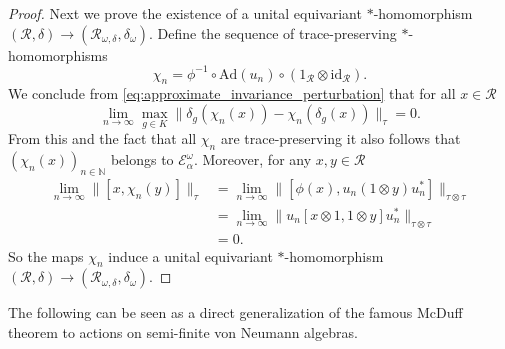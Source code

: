 \documentclass[11pt,a4paper]{article}
\theoremstyle{definition}
\theoremstyle{remark}
\numberwithin{equation}{section}
\numberwithin{theorem}{section}
\newcommand{\N}{\mathbb{N}}
\begin{document}
\begin{proof}
Next we prove the existence of a unital equivariant $*$-homomorphism $(\mathcal{R}, \delta) \rightarrow (\mathcal{R}_{\omega,\delta}, \delta_\omega)$. Define the sequence of trace-preserving $*$-homomorphisms 
\[\chi_n = \phi^{-1} \circ \mathrm{Ad}(u_n) \circ (1_\mathcal{R} \otimes \mathrm{id}_\mathcal{R}).\] 
%
We conclude from \eqref{eq:approximate_invariance_perturbation} that for all $x \in \mathcal{R}$
\[\lim_{n \rightarrow \infty} \max_{g \in K} \|\delta_g(\chi_n(x)) - \chi_n(\delta_g(x))\|_{\tau} =0.\]
From this and the fact that all $\chi_n$ are trace-preserving it also follows that $(\chi_n(x))_{n \in \N}$ belongs to $\mathcal{E}^\omega_\alpha$.
Moreover, for any $x,y \in \mathcal{R}$
\begin{align*}
\lim_{n \rightarrow \infty} \|[x, \chi_n(y)] \|_\tau
&= \lim_{n \rightarrow \infty}\|[\phi(x), u_n(1 \otimes y) u_n^*]\|_{\tau \otimes \tau}\\
&= \lim_{n \rightarrow \infty}\|u_n[x \otimes 1, 1 \otimes y] u_n^*\|_{\tau \otimes \tau}\\
&=0. 
\end{align*}
So the maps $\chi_n$ induce a unital equivariant $*$-homomorphism $(\mathcal{R}, \delta) \rightarrow (\mathcal{R}_{\omega,\delta}, \delta_\omega)$.
\end{proof}

The following can be seen as a direct generalization of the famous McDuff theorem \cite{McDuff70} to actions on semi-finite von Neumann algebras.
\end{document}
